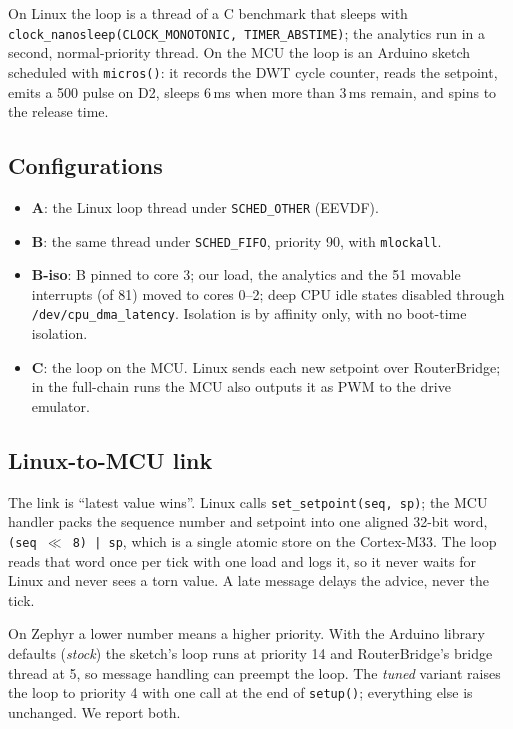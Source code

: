 On Linux the loop is a thread of a C benchmark that sleeps with \texttt{clock\_nanosleep(CLOCK\_MONOTONIC, TIMER\_ABSTIME)}; the analytics run in a second, normal-priority thread. On the MCU the loop is an Arduino sketch scheduled with \texttt{micros()}: it records the DWT cycle counter, reads the setpoint, emits a 500\us{} pulse on D2, sleeps 6\,ms when more than 3\,ms remain, and spins to the release time.

\subsection{Configurations}
\begin{itemize}
\item \textbf{A}: the Linux loop thread under \texttt{SCHED\_OTHER} (EEVDF).
\item \textbf{B}: the same thread under \texttt{SCHED\_FIFO}, priority 90, with \texttt{mlockall}.
\item \textbf{B-iso}: B pinned to core 3; our load, the analytics and the 51 movable interrupts (of 81) moved to cores 0--2; deep CPU idle states disabled through \texttt{/dev/cpu\_dma\_latency}. Isolation is by affinity only, with no boot-time isolation.
\item \textbf{C}: the loop on the MCU. Linux sends each new setpoint over RouterBridge; in the full-chain runs the MCU also outputs it as PWM to the drive emulator.
\end{itemize}

\subsection{Linux-to-MCU link}
The link is ``latest value wins''. Linux calls \texttt{set\_setpoint(seq, sp)}; the MCU handler packs the sequence number and setpoint into one aligned 32-bit word, \texttt{(seq $\ll$ 8) | sp}, which is a single atomic store on the Cortex-M33. The loop reads that word once per tick with one load and logs it, so it never waits for Linux and never sees a torn value. A late message delays the advice, never the tick.

On Zephyr a lower number means a higher priority. With the Arduino library defaults (\emph{stock}) the sketch's loop runs at priority 14 and RouterBridge's bridge thread at 5, so message handling can preempt the loop. The \emph{tuned} variant raises the loop to priority 4 with one call at the end of \texttt{setup()}; everything else is unchanged. We report both.
